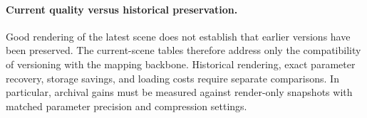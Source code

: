 \paragraph{Current quality versus historical preservation.}
Good rendering of the latest scene does not establish that
earlier versions have been preserved.
The current-scene tables therefore address only the compatibility
of versioning with the mapping backbone.
Historical rendering, exact parameter recovery, storage savings,
and loading costs require separate comparisons.
In particular, archival gains must be measured against
render-only snapshots with matched parameter precision
and compression settings.
